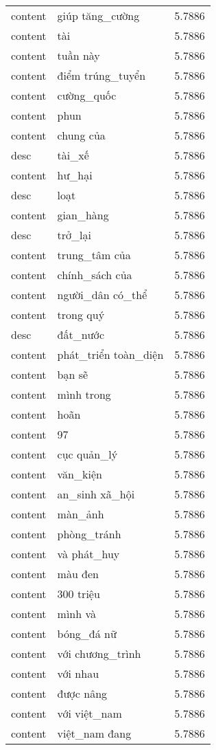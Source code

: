 \documentclass{article}
\begin{document}
\begin{tabular}{lll}
content & giúp tăng\_cường & 5.7886\\
content & tài & 5.7886\\
content & tuần này & 5.7886\\
content & điểm trúng\_tuyển & 5.7886\\
content & cường\_quốc & 5.7886\\
content & phun & 5.7886\\
content & chung của & 5.7886\\
desc & tài\_xế & 5.7886\\
content & hư\_hại & 5.7886\\
desc & loạt & 5.7886\\
content & gian\_hàng & 5.7886\\
desc & trở\_lại & 5.7886\\
content & trung\_tâm của & 5.7886\\
content & chính\_sách của & 5.7886\\
content & người\_dân có\_thể & 5.7886\\
content & trong quý & 5.7886\\
desc & đất\_nước & 5.7886\\
content & phát\_triển toàn\_diện & 5.7886\\
content & bạn sẽ & 5.7886\\
content & mình trong & 5.7886\\
content & hoãn & 5.7886\\
content & 97 & 5.7886\\
content & cục quản\_lý & 5.7886\\
content & văn\_kiện & 5.7886\\
content & an\_sinh xã\_hội & 5.7886\\
content & màn\_ảnh & 5.7886\\
content & phòng\_tránh & 5.7886\\
content & và phát\_huy & 5.7886\\
content & màu đen & 5.7886\\
content & 300 triệu & 5.7886\\
content & mình và & 5.7886\\
content & bóng\_đá nữ & 5.7886\\
content & với chương\_trình & 5.7886\\
content & với nhau & 5.7886\\
content & được nâng & 5.7886\\
content & với việt\_nam & 5.7886\\
content & việt\_nam đang & 5.7886\\

\end{tabular}
\end{document}
